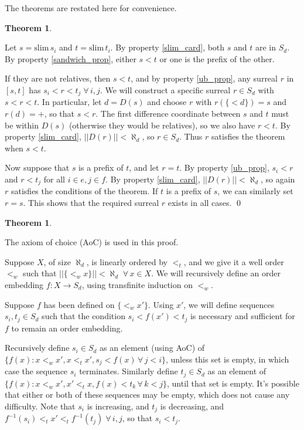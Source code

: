 \documentclass[11pt]{amsart}
\newtheorem{Thm}[Def]{Theorem}
\newcommand\bpf[1][]{\smallskip\noindent{\bf Proof#1.}\quad}
\newcommand\epf{\qed\medskip}
\newcommand{\slim}{\mathrm{slim}\,}
\begin{document}
The theorems are restated here for convenience.

{
\renewcommand{\theDef}{\ref{nested_intervals_result}}
\begin{Thm}
\densitytheorem
\end{Thm}
\addtocounter{Def}{-1}
}

\smallskip
\bpf
Let $s = \slim s_i$ and $t = \slim t_i$.  By property \ref{slim_card}, both
$s$ and $t$ are in $S_d$.
By property \ref{sandwich_prop}, either $s < t$ or one is the prefix of the other.

If they are not relatives, then $s < t$,
and by property \ref{ub_prop}, any surreal $r$ in $[s,t]$ has $s_i < r < t_j \;\forall\, i,j$.
We will construct a specific surreal $r\in S_d$ with $s < r < t$.
In particular, let $d = D(s)$ and choose $r$ with $r(\{<d\}) = s$ and $r(d) = +$, so that
$s < r$.  The first difference coordinate between $s$ and $t$ must be within $D(s)$
(otherwise they would be relatives), so we also have $r < t$.  By property \ref{slim_card},
$||D(r)|| < \aleph_d$, so $r\in S_d$.  Thus $r$ satisfies the theorem when $s < t$.

Now suppose that $s$ is a prefix of $t$, and let $r=t$.
By property \ref{ub_prop},
$s_i < r$ and $r < t_j$ for all $i\in e, j\in f$.
By property \ref{slim_card},
$||D(r)|| < \aleph_d$, so again $r$ satisfies the conditions of the theorem.  If $t$ is a prefix
of $s$, we can similarly set $r=s$.  This shows
that the required surreal $r$ exists in all cases.
\epf

{
\renewcommand{\theDef}{\ref{canonical_orders_result}}
\begin{Thm}
\universaltheorem
\end{Thm}
\addtocounter{Def}{-1}
}

\bpf
The axiom of choice (AoC) is used in this proof.

Suppose $X$, of size $\aleph_d$, is linearly ordered by $<_t$, and we give it a well order $<_w$
such that $||\{<_w x\}|| < \aleph_d \;\forall\, x\in X$.
We will recursively define an order embedding $f:X\to S_d$, using transfinite induction on $<_w$.

Suppose $f$ has been defined on $\{<_w x'\}$.
Using $x'$, we will define sequences $s_i,t_j\in S_d$ such that the condition
$s_i < f(x') < t_j$ is necessary and sufficient for $f$ to remain an order embedding.

Recursively define $s_i\in S_d$ as an element (using AoC) of $\{f(x) : x<_w x', x<_t x', s_j < f(x) \,\forall\, j < i\}$,
unless this set is empty, in which case the sequence $s_i$ terminates.
Similarly define $t_j\in S_d$ as an element of $\{f(x) : x <_w x', x' <_t x, f(x) < t_k \,\forall\, k < j\}$, until
that set is empty.
It's possible that either or both of these sequences may be empty, which does not cause any difficulty.
Note that $s_i$ is increasing, and $t_j$ is decreasing, and $f^{-1}(s_i) <_t x' <_t f^{-1}(t_j)\;\forall\, i,j$,
so that $s_i < t_j$.
\end{document}
